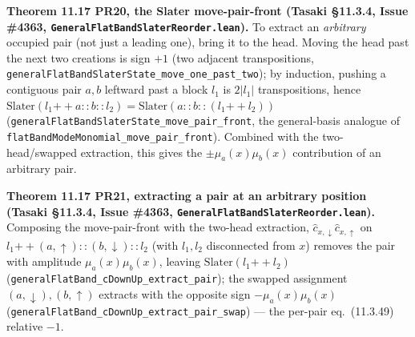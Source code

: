 \documentclass[a4paper,11pt]{article}
\begin{document}
\medskip\noindent\textbf{Theorem 11.17 PR20, the Slater move-pair-front (Tasaki §11.3.4, Issue
\#4363, \texttt{GeneralFlatBandSlaterReorder.lean}).}  To extract an \emph{arbitrary} occupied pair
(not just a leading one), bring it to the head.  Moving the head past the next two creations is sign
$+1$ (two adjacent transpositions, \texttt{generalFlatBandSlaterState\_move\_one\_past\_two}); by
induction, pushing a contiguous pair $a,b$ leftward past a block $l_1$ is $2|l_1|$ transpositions,
hence $\text{Slater}(l_1 \mathbin{+\!+} a\!::\!b\!::\!l_2) = \text{Slater}(a\!::\!b\!::\!(l_1
\mathbin{+\!+} l_2))$ (\texttt{generalFlatBandSlaterState\_move\_pair\_front}, the general-basis
analogue of \texttt{flatBandModeMonomial\_move\_pair\_front}).  Combined with the two-head/swapped
extraction, this gives the $\pm\mu_a(x)\mu_b(x)$ contribution of an arbitrary pair.

\medskip\noindent\textbf{Theorem 11.17 PR21, extracting a pair at an arbitrary position (Tasaki
§11.3.4, Issue \#4363, \texttt{GeneralFlatBandSlaterReorder.lean}).}  Composing the move-pair-front
with the two-head extraction, $\hat c_{x,\downarrow}\hat c_{x,\uparrow}$ on
$l_1 \mathbin{+\!+} (a,\uparrow)\!::\!(b,\downarrow)\!::\!l_2$ (with $l_1,l_2$ disconnected from $x$)
removes the pair with amplitude $\mu_a(x)\mu_b(x)$, leaving $\text{Slater}(l_1 \mathbin{+\!+} l_2)$
(\texttt{generalFlatBand\_cDownUp\_extract\_pair}); the swapped assignment $(a,\downarrow),(b,\uparrow)$
extracts with the opposite sign $-\mu_a(x)\mu_b(x)$
(\texttt{generalFlatBand\_cDownUp\_extract\_pair\_swap}) --- the per-pair eq.~(11.3.49) relative
$-1$.
\end{document}
